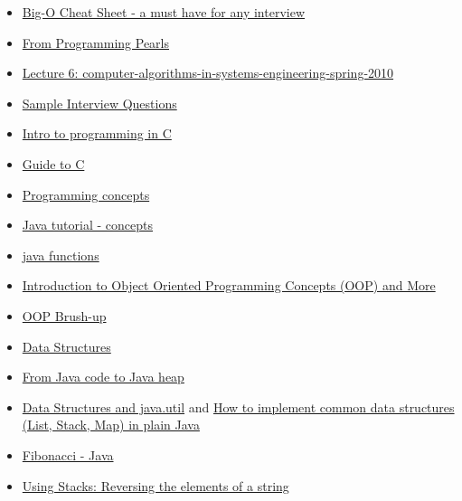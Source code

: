 \documentclass[letterpaper]{article}
\begin{document}
\begin{itemize}
\item \href{http://bigocheatsheet.com}{Big-O Cheat Sheet - a must have for any interview}
\item \href{http://netlib.bell-labs.com/cm/cs/pearls/sol01.html}{From Programming Pearls}
\item \href{http://ocw.mit.edu/courses/civil-and-environmental-engineering/1-204-computer-algorithms-in-systems-engineering-spring-2010/lecture-notes/MIT1_204S10_lec06.pdf}{Lecture 6: computer-algorithms-in-systems-engineering-spring-2010}
\item \href{http://kundansingh.com/interview/#h1}{Sample Interview Questions}
\item \href{http://www.cprogramming.com/tutorial/c/lesson1.html}{Intro to programming in C}
\item \href{http://www.acm.uiuc.edu/webmonkeys/book/c_guide/1.2.html}{Guide to C}
\item \href{http://www.ncl.ucar.edu/Document/HLUs/User_Guide/classes/classoview.shtml}{Programming concepts}
\item \href{http://docs.oracle.com/javase/tutorial/java/concepts/}{Java tutorial - concepts}
\item \href{http://introcs.cs.princeton.edu/java/21function/}{java functions}
\item \href{http://www.codeproject.com/Articles/22769/Introduction-to-Object-Oriented-Programming-Concep}{Introduction to Object Oriented Programming Concepts (OOP) and More}
\item \href{http://www.victusspiritus.com/2011/03/15/brushing-up-on-computer-science-part-2-object-oriented-programming-oop/}{OOP Brush-up} 
\item \href{http://www.seas.gwu.edu/~drum/cs1112/lectures/module8/module8.html}
	  {Data Structures}
\item \href{http://www.ibm.com/developerworks/library/j-codetoheap/}
	  {From Java code to Java heap}
\item \href{http://www.cafeaulait.org/books/jdr/examples/21/}{Data Structures and java.util} 
and \href{http://www.vogella.com/articles/JavaDatastructures/article.html}{How to implement common data structures (List, Stack, Map) in plain Java}
\item \href{http://introcs.cs.princeton.edu/java/92symbolic/Fibonacci.java.html}
	  {Fibonacci - Java}
\item \href{http://www.tutorialspoint.com/javaexamples/data_reverse.htm}
	  {Using Stacks: Reversing the elements of a string} 
\end{itemize} 
 
\end{document}

